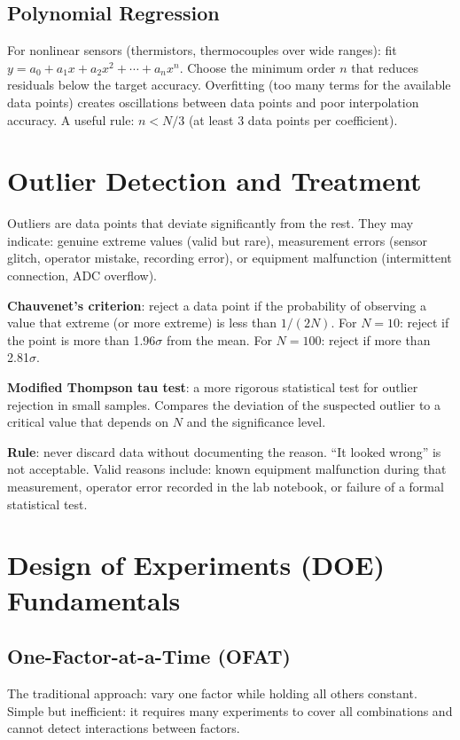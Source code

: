 \documentclass[11pt,letterpaper,twoside,openany]{book}
\begin{document}
\subsection{Polynomial Regression}
For nonlinear sensors (thermistors, thermocouples over wide ranges): fit $y = a_0 + a_1 x + a_2 x^2 + \cdots + a_n x^n$. Choose the minimum order $n$ that reduces residuals below the target accuracy. Overfitting (too many terms for the available data points) creates oscillations between data points and poor interpolation accuracy. A useful rule: $n < N/3$ (at least 3 data points per coefficient).

\section{Outlier Detection and Treatment}
Outliers are data points that deviate significantly from the rest. They may indicate: genuine extreme values (valid but rare), measurement errors (sensor glitch, operator mistake, recording error), or equipment malfunction (intermittent connection, ADC overflow).

\textbf{Chauvenet's criterion}: reject a data point if the probability of observing a value that extreme (or more extreme) is less than $1/(2N)$. For $N = 10$: reject if the point is more than 1.96$\sigma$ from the mean. For $N = 100$: reject if more than 2.81$\sigma$.

\textbf{Modified Thompson tau test}: a more rigorous statistical test for outlier rejection in small samples. Compares the deviation of the suspected outlier to a critical value that depends on $N$ and the significance level.

\textbf{Rule}: never discard data without documenting the reason. ``It looked wrong'' is not acceptable. Valid reasons include: known equipment malfunction during that measurement, operator error recorded in the lab notebook, or failure of a formal statistical test.

\section{Design of Experiments (DOE) Fundamentals}
\subsection{One-Factor-at-a-Time (OFAT)}
The traditional approach: vary one factor while holding all others constant. Simple but inefficient: it requires many experiments to cover all combinations and cannot detect interactions between factors.
\end{document}
